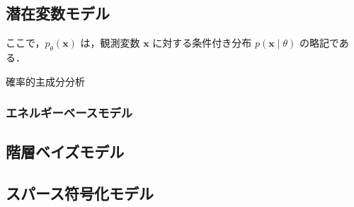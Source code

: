 \documentclass[titlepage]{ltjsbook}
\begin{document}
\subsection{潜在変数モデル}
ここで，$p_\theta(\mathbf{x})$ は，観測変数 $\mathbf{x}$ に対する条件付き分布 $p(\mathbf{x} \mid \theta)$ の略記である．

確率的主成分分析
\subsubsection{エネルギーベースモデル}

\subsection{階層ベイズモデル}

\subsection{スパース符号化モデル}
\end{document}
